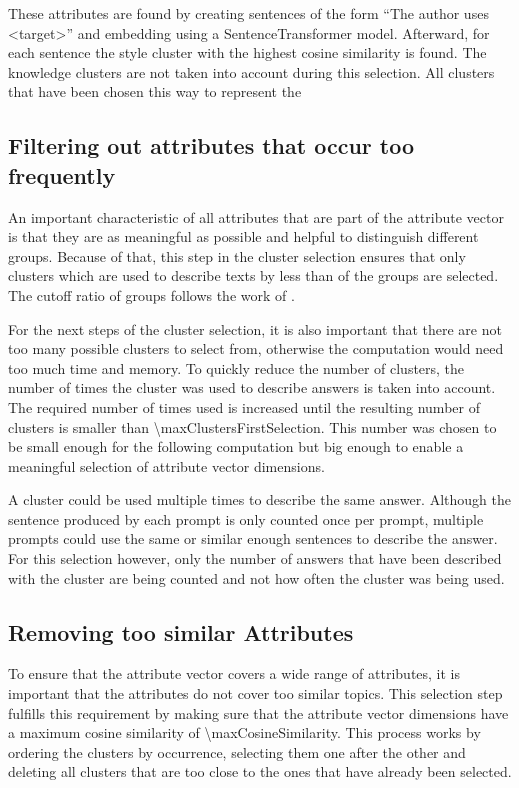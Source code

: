 These attributes are found by creating sentences of the form \enquote{The author uses <target>} and embedding using a SentenceTransformer model. %
Afterward, for each sentence the style cluster with the highest cosine similarity is found. The knowledge clusters are not taken into account during this selection.
All clusters that have been chosen this way to represent the


\subsection{Filtering out attributes that occur too frequently}
\label{sec:approach:selection:filteringOccurance}
An important characteristic of all attributes that are part of the attribute vector is that they are as meaningful as possible and helpful to distinguish different groups. Because of that, this step in the cluster selection ensures that only clusters which are used to describe texts by less than \clusterMaxGroupRatio{} of the groups are selected. The cutoff ratio of groups follows the work of \citet{patelLearningInterpretableStyle2023}.

For the next steps of the cluster selection, it is also important that there are not too many possible clusters to select from, otherwise the computation would need too much time and memory. To quickly reduce the number of clusters, the number of times the cluster was used to describe answers is taken into account. The required number of times used is increased until the resulting number of clusters is smaller than \num{\maxClustersFirstSelection}. This number was chosen to be small enough for the following computation but big enough to enable a meaningful selection of attribute vector dimensions.

A cluster could be used multiple times to describe the same answer. Although the sentence produced by each prompt is only counted once per prompt, multiple prompts could use the same or similar enough sentences to describe the answer. For this selection however, only the number of answers that have been described with the cluster are being counted and not how often the cluster was being used.

\subsection{Removing too similar Attributes}
\label{sec:approach:selection:removeSimilar}
To ensure that the attribute vector covers a wide range of attributes, it is important that the attributes do not cover too similar topics. This selection step fulfills this requirement by making sure that the attribute vector dimensions have a maximum cosine similarity of \num{\maxCosineSimilarity}. This process works by ordering the clusters by occurrence, selecting them one after the other and deleting all clusters that are too close to the ones that have already been selected.

